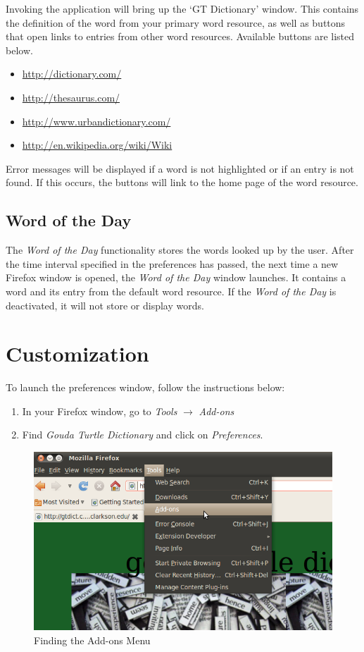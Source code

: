 \documentclass[11pt]{article}
\begin{document}
Invoking the application will bring up the `GT Dictionary' window.
This contains the definition of the word from your primary word resource, as
well as buttons that open links to entries from other word
resources. Available buttons are listed below.
\begin{itemize}
\item{\url{http://dictionary.com/}}
\item{\url{http://thesaurus.com/}}
\item{\url{http://www.urbandictionary.com/}}
\item{\url{http://en.wikipedia.org/wiki/Wiki}}
\end{itemize}
Error messages will be displayed if a word is not highlighted or if an entry is
not found. If this occurs, the buttons will link to the home page of the word
resource.

\subsection{Word of the Day}
The \textit{Word of the Day} functionality stores the words looked up by the user.
After the time interval specified in the preferences
has passed, the next time a new Firefox window is opened,
the \textit{Word of the Day} window launches.
It contains a word and its entry from the default word resource.
If the \textit{Word of the Day} is deactivated,
it will not store or display words.

\section{Customization}
To launch the preferences window, follow the instructions below:

\begin{enumerate}
    \item{In your Firefox window, go to
    \emph{Tools} $\rightarrow$ \emph{Add-ons}}
    \item{Find \emph{Gouda Turtle Dictionary} and click on \emph{Preferences}.}
\end{enumerate}

\begin{figure}[ht!]
\centering
\includegraphics[scale=0.3]{gt2.png}
\caption{Finding the Add-ons Menu}
\label{prefs}
\end{figure}
\end{document}
